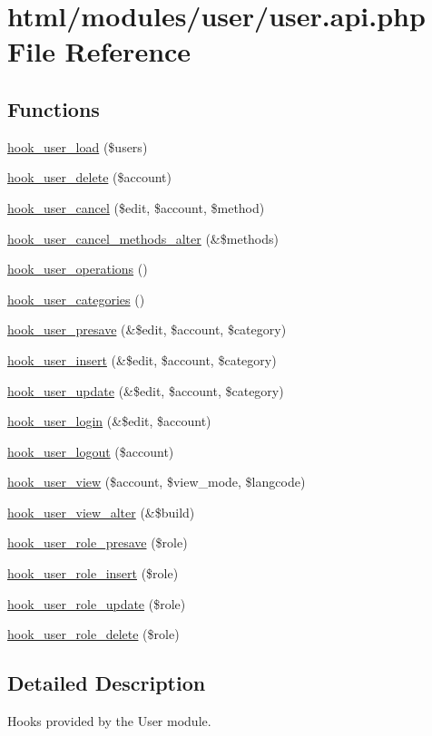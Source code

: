 \hypertarget{user_8api_8php}{
\section{html/modules/user/user.api.php File Reference}
\label{user_8api_8php}
}
\subsection*{Functions}
\begin{DoxyCompactItemize}
\item 
\hyperlink{group__hooks_ga81027843e38de3a899fa6e72f876d6b6}{hook\_\-user\_\-load} (\$users)
\item 
\hyperlink{group__hooks_ga2c0755857e486e8a770b44b496da9929}{hook\_\-user\_\-delete} (\$account)
\item 
\hyperlink{group__hooks_gad6223ddd2f0f52c331df8a3315d9a41e}{hook\_\-user\_\-cancel} (\$edit, \$account, \$method)
\item 
\hyperlink{group__hooks_gadbac37235bb01361bf8b3d375ea417a5}{hook\_\-user\_\-cancel\_\-methods\_\-alter} (\&\$methods)
\item 
\hyperlink{group__hooks_ga1b2c2630f79b64b0673d0a9a0983f447}{hook\_\-user\_\-operations} ()
\item 
\hyperlink{group__hooks_ga166a3fe9d203a99560d10413a880ed08}{hook\_\-user\_\-categories} ()
\item 
\hyperlink{group__hooks_gab6b224c35d7d97259d4350a7849f1e56}{hook\_\-user\_\-presave} (\&\$edit, \$account, \$category)
\item 
\hyperlink{group__hooks_gaa3e2c4c972ee796d216b15da7aaf9c2c}{hook\_\-user\_\-insert} (\&\$edit, \$account, \$category)
\item 
\hyperlink{group__hooks_gab71262402336071ef7c3d08f4c36e887}{hook\_\-user\_\-update} (\&\$edit, \$account, \$category)
\item 
\hyperlink{group__hooks_ga8cce712a39ee6e57bd506b5a0c457d09}{hook\_\-user\_\-login} (\&\$edit, \$account)
\item 
\hyperlink{group__hooks_ga49a4bb63d4b643cf9e3feb2266fe4865}{hook\_\-user\_\-logout} (\$account)
\item 
\hyperlink{group__hooks_gaafb9e35d1f82a33918437ad7acf29541}{hook\_\-user\_\-view} (\$account, \$view\_\-mode, \$langcode)
\item 
\hyperlink{group__hooks_ga31a81ec1419afc31ebb77a9a86afe754}{hook\_\-user\_\-view\_\-alter} (\&\$build)
\item 
\hyperlink{group__hooks_ga0b603e56348f9a8ab31505cc7e7acd36}{hook\_\-user\_\-role\_\-presave} (\$role)
\item 
\hyperlink{group__hooks_ga79141c13b24e953eac78d810b530e96e}{hook\_\-user\_\-role\_\-insert} (\$role)
\item 
\hyperlink{group__hooks_ga4c71374906f72f8a80b0c954202f86da}{hook\_\-user\_\-role\_\-update} (\$role)
\item 
\hyperlink{group__hooks_gaf2a69f678861a227e36de13b87c340a7}{hook\_\-user\_\-role\_\-delete} (\$role)
\end{DoxyCompactItemize}


\subsection{Detailed Description}
Hooks provided by the User module. 